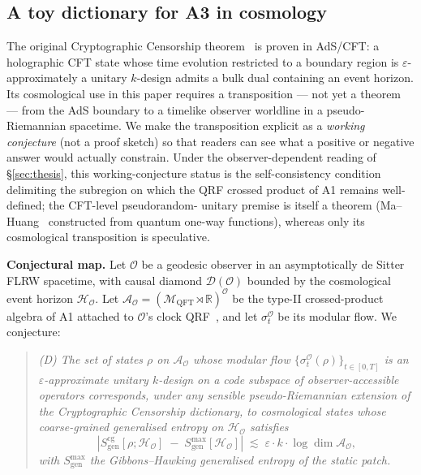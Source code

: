 
\subsection{A toy dictionary for A3 in cosmology}\label{sec:A3-dictionary}

The original Cryptographic Censorship theorem~\cite{CryptoCensorship} is
proven in AdS/CFT: a holographic CFT state whose time evolution restricted
to a boundary region is $\varepsilon$-approximately a unitary $k$-design
admits a bulk dual containing an event horizon. Its cosmological use in
this paper requires a transposition --- not yet a theorem --- from the
AdS boundary to a timelike observer worldline in a pseudo-Riemannian
spacetime. We make the transposition explicit as a \emph{working
conjecture} (not a proof sketch) so that readers can see what a positive
or negative answer would actually constrain. Under the observer-dependent
reading of \S\ref{sec:thesis}, this working-conjecture status is the
self-consistency condition delimiting the subregion on which the QRF
crossed product of A1 remains well-defined; the CFT-level pseudorandom-
unitary premise is itself a theorem (Ma--Huang~\cite{MaHuang2025}
constructed from quantum one-way functions), whereas only its cosmological
transposition is speculative.

\medskip\noindent\textbf{Conjectural map.}\;
Let $\mathcal{O}$ be a geodesic observer in an asymptotically de Sitter
FLRW spacetime, with causal diamond $\mathcal{D}(\mathcal{O})$ bounded by
the cosmological event horizon $\mathcal{H}_\mathcal{O}$. Let
$\mathcal{A}_{\mathcal{O}} = \left( \mathcal{M}_{\mathrm{QFT}} \rtimes
\mathbb{R} \right)^{\mathcal{O}}$ be the type-II crossed-product algebra
of A1 attached to $\mathcal{O}$'s clock QRF~\cite{CLPW2023,DEHK2025a,DEHK2025b},
and let $\sigma_t^{\mathcal{O}}$ be its modular flow. We conjecture:

\begin{quote}
\emph{(D) The set of states $\rho$ on $\mathcal{A}_{\mathcal{O}}$ whose
modular flow $\{\sigma_t^{\mathcal{O}}(\rho)\}_{t \in [0,T]}$ is an
$\varepsilon$-approximate unitary $k$-design on a code subspace of
observer-accessible operators corresponds, under any sensible
pseudo-Riemannian extension of the Cryptographic Censorship dictionary,
to cosmological states whose coarse-grained generalised entropy on
$\mathcal{H}_\mathcal{O}$ satisfies}
\begin{equation}
\left| S_{\mathrm{gen}}^{\mathrm{cg}}[\rho; \mathcal{H}_\mathcal{O}]
  \;-\; S_{\mathrm{gen}}^{\max}[\mathcal{H}_\mathcal{O}] \right|
  \;\lesssim\; \varepsilon \cdot k \cdot \log\!\dim \mathcal{A}_{\mathcal{O}},
\label{eq:toy-dict}
\end{equation}
\emph{with $S_{\mathrm{gen}}^{\max}$ the Gibbons--Hawking generalised
entropy of the static patch.}
\end{quote}

